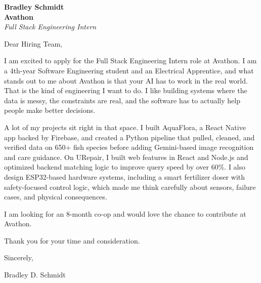 \documentclass[11pt]{article}
\begin{document}
\textbf{Bradley Schmidt}\\
\vspace{0.5em}
\textbf{Avathon}\\
\textit{Full Stack Engineering Intern}

Dear Hiring Team,

\par

I am excited to apply for the Full Stack Engineering Intern role at Avathon. I am a 4th-year Software Engineering student and an Electrical Apprentice, and what stands out to me about Avathon is that your AI has to work in the real world. That is the kind of engineering I want to do. I like building systems where the data is messy, the constraints are real, and the software has to actually help people make better decisions.

\par

A lot of my projects sit right in that space. I built AquaFlora, a React Native app backed by Firebase, and created a Python pipeline that pulled, cleaned, and verified data on 650+ fish species before adding Gemini-based image recognition and care guidance. On URepair, I built web features in React and Node.js and optimized backend matching logic to improve query speed by over 60\%. I also design ESP32-based hardware systems, including a smart fertilizer doser with safety-focused control logic, which made me think carefully about sensors, failure cases, and physical consequences.

\par

I am looking for an 8-month co-op and would love the chance to contribute at Avathon.

\par

Thank you for your time and consideration.

\par

Sincerely,

\par

Bradley D. Schmidt
\end{document}
